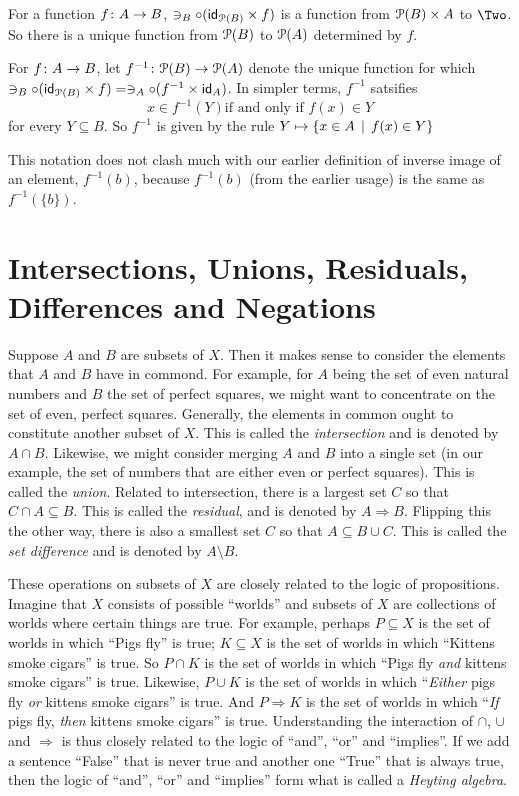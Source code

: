 For a function ${f}\colon{A}\to{B}$, $\ni_B\circ (\textsf{id}_{{\mathcal{P}}(B)}\times f)$ is a function from ${\mathcal{P}}(B)\times A$ to $\Two$. So there is a unique function
from ${\mathcal{P}}(B)$ to ${\mathcal{P}}(A)$ determined by $f$. 

\begin{defn}
	For ${f}\colon{A}\to{B}$, let ${f^{-1}}\colon{{\mathcal{P}}(B)}\to{{\mathcal{P}}(A)}$ denote
	the unique function for which $\ni_B\circ (\textsf{id}_{{\mathcal{P}}(B)}\times f) = \ni_A\circ(f^{-1}\times \textsf{id}_A)$. In simpler terms, $f^{-1}$ satsifies
	\[x\in f^{-1}(Y) \text{if and only if } f(x)\in Y\]
	for every $Y\subseteq B$.  So $f^{-1}$ is given by the rule $Y\mapsto \{x\in A\,\mid\, f(x)\in Y\}$
\end{defn}

This notation does not clash much with our earlier definition of inverse image of an element, $f^{-1}(b)$, because 
$f^{-1}(b)$ (from the earlier usage) is the same as $f^{-1}(\{b\})$.

\section{Intersections, Unions, Residuals, Differences and Negations}

Suppose $A$ and $B$ are subsets of $X$. 
Then it makes sense to consider the elements that $A$ and $B$ have in commond. 
For example, for $A$ being the set of even natural numbers and $B$ the set of perfect squares, we might want to concentrate on the set of even, perfect squares.
Generally, the elements in common ought to constitute another subset of $X$.
This is called the \emph{intersection} and is denoted by $A\cap B$.
Likewise, we might consider merging $A$ and $B$ into a single set (in our example, the set of numbers that are either even or perfect squares).
This is called the \emph{union}.
Related to intersection, there is a largest set $C$ so that $C\cap A\subseteq B$. 
This is called the \emph{residual}, and is denoted by $A\Rightarrow B$.
Flipping this the other way, there is also a smallest set $C$ so that $A\subseteq B\cup C$. This is called the \emph{set difference} and is denoted by $A\setminus B$. 

These operations on subsets of $X$ are closely related to the logic of propositions.
Imagine that $X$ consists of possible ``worlds'' and subsets of $X$ are collections of worlds where certain things are true.
For example, perhaps $P\subseteq X$ is the set of worlds in which ``Pigs fly'' is true;
$K\subseteq X$ is the set of worlds in which ``Kittens smoke cigars'' is true.
So $P\cap K$ is the set of worlds in which ``Pigs fly \emph{and} kittens smoke cigars'' is true.
Likewise, $P\cup K$ is the set of worlds in which ``\emph{Either} pigs fly \emph{or} kittens smoke cigars'' is true.
And $P\Rightarrow K$ is the set of worlds in which ``\emph{If} pigs fly, \emph{then} kittens smoke cigars'' is true. Understanding the interaction of $\cap$, $\cup$ and $\Rightarrow$ is thus closely related to the logic of ``and'', ``or'' and ``implies''. If we add a sentence ``False'' that is never true and another one ``True'' that is always true, then the logic of ``and'', ``or'' and ``implies'' form what is called a \emph{Heyting algebra}.

